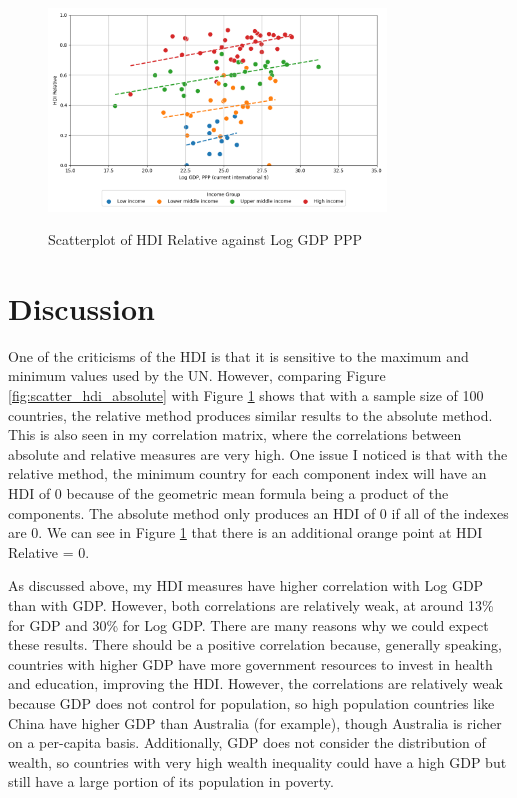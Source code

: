 \documentclass[12pt]{article}
\begin{document}
\begin{figure}[H]
\centering
\caption{Scatterplot of HDI Relative against Log GDP PPP}
\includegraphics[width=0.8\textwidth]{./output/Scatterplot HDI Relative.png}
\label{fig:scatter_hdi_relative}
\end{figure}

\section{Discussion}
 One of the criticisms of the HDI is that it is sensitive to the maximum and minimum values used by the UN. However, comparing Figure \ref{fig:scatter_hdi_absolute} with Figure \ref{fig:scatter_hdi_relative} shows that with a sample size of 100 countries, the relative method produces similar results to the absolute method. This is also seen in my correlation matrix, where the correlations between absolute and relative measures are very high. One issue I noticed is that with the relative method, the minimum country for each component index will have an HDI of 0 because of the geometric mean formula being a product of the components. The absolute method only produces an HDI of 0 if all of the indexes are 0. We can see in Figure \ref{fig:scatter_hdi_relative} that there is an additional orange point at HDI Relative = 0.

 As discussed above, my HDI measures have higher correlation with Log GDP than with GDP. However, both correlations are relatively weak, at around 13\% for GDP and 30\% for Log GDP. There are many reasons why we could expect these results. There should be a positive correlation because, generally speaking, countries with higher GDP have more government resources to invest in health and education, improving the HDI. However, the correlations are relatively weak because GDP does not control for population, so high population countries like China have higher GDP than Australia (for example), though Australia is richer on a per-capita basis. Additionally, GDP does not consider the distribution of wealth, so countries with very high wealth inequality could have a high GDP but still have a large portion of its population in poverty.
\end{document}
